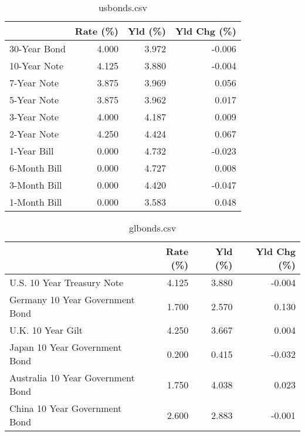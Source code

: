 \documentclass{article}%
\begin{document}
%


\begin{table}[htbp]%
\caption{usbonds.csv}%
\centering%
\begin{adjustbox}{width=1\textwidth}%
\begin{tabular}{lrrr}
\toprule
             &  Rate (\%) &  Yld (\%) &  Yld Chg (\%) \\
\midrule
30-Year Bond &     4.000 &    3.972 &       -0.006 \\
10-Year Note &     4.125 &    3.880 &       -0.004 \\
 7-Year Note &     3.875 &    3.969 &        0.056 \\
 5-Year Note &     3.875 &    3.962 &        0.017 \\
 3-Year Note &     4.000 &    4.187 &        0.009 \\
 2-Year Note &     4.250 &    4.424 &        0.067 \\
 1-Year Bill &     0.000 &    4.732 &       -0.023 \\
6-Month Bill &     0.000 &    4.727 &        0.008 \\
3-Month Bill &     0.000 &    4.420 &       -0.047 \\
1-Month Bill &     0.000 &    3.583 &        0.048 \\
\bottomrule
\end{tabular}
%
\end{adjustbox}%
\end{table}

%


\begin{table}[htbp]%
\caption{glbonds.csv}%
\centering%
\begin{adjustbox}{width=1\textwidth}%
\begin{tabular}{lrrr}
\toprule
                                  &  Rate (\%) &  Yld (\%) &  Yld Chg (\%) \\
\midrule
       U.S. 10 Year Treasury Note &     4.125 &    3.880 &       -0.004 \\
  Germany 10 Year Government Bond &     1.700 &    2.570 &        0.130 \\
                U.K. 10 Year Gilt &     4.250 &    3.667 &        0.004 \\
    Japan 10 Year Government Bond &     0.200 &    0.415 &       -0.032 \\
Australia 10 Year Government Bond &     1.750 &    4.038 &        0.023 \\
    China 10 Year Government Bond &     2.600 &    2.883 &       -0.001 \\
\bottomrule
\end{tabular}
%
\end{adjustbox}%
\end{table}
\end{document}
